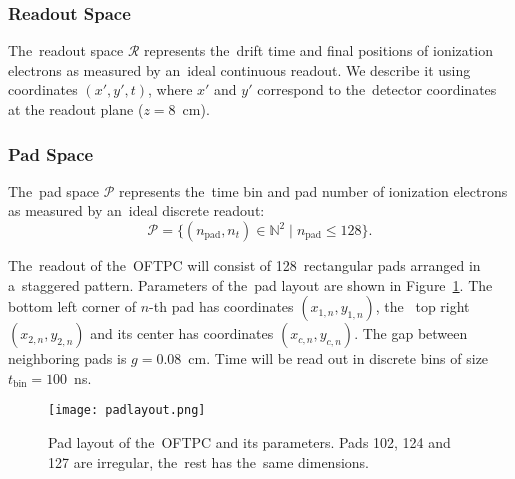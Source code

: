 			\subsubsection{Readout Space}
				The~readout space $\mathcal{R}$ represents the~drift time and final positions of ionization electrons as measured by an~ideal continuous readout. We describe it using coordinates $(x',y',t)$, where $x'$ and $y'$ correspond to the~detector coordinates at the readout plane ($z = 8$~cm).
				
			
			\subsubsection{Pad Space}
				The~pad space $\mathcal{P}$ represents the~time bin and pad number of ionization electrons as measured by an~ideal discrete readout:
					\begin{equation}
						\mathcal{P} = \{(n_\text{pad},n_t)\in\mathbb{N}^2 \mid n_\text{pad}\leq128\}.
					\end{equation}
				
				The~readout of the~\ac{OFTPC} will consist of 128~rectangular pads arranged in a~staggered pattern. Parameters of the~pad layout are shown in Figure~\ref{fig:padlayout}. The bottom left corner of $n$\nobreakdash-th pad has coordinates $(x_{1,n},y_{1,n})$, the~ top right $(x_{2,n},y_{2,n})$ and its center has coordinates $(x_{c,n},y_{c,n})$. The gap between neighboring pads is $g=0.08$~cm. Time will be read out in discrete bins of size $t_\text{bin}=100$~ns.
			
				\begin{figure}[H]
					\centering
					\texttt{[image: padlayout.png]}
					\caption{Pad layout of the~\ac{OFTPC} and its parameters. Pads 102, 124 and 127 are irregular, the~rest has the~same dimensions.}
					\label{fig:padlayout}
				\end{figure}
		
